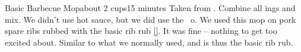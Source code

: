 
\begin{recipe}{Basic Barbecue Mop}{about 2 cups}{15 minutes}
\freeform Taken from \emph{}.
Combine all ings and mix.
\freeform We didn't use hot sauce, but we did use the ~o.  We used this mop on pork spare ribs rubbed with the basic rib rub \ref{}.  It was fine -- nothing to get too excited about.  Similar to what we normally used, and is thus the basic rib rub.
\end{recipe}
